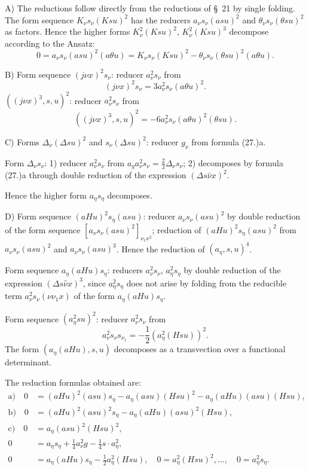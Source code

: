 \documentclass[11pt]{article}
\newcommand{\A}{\Delta}
\begin{document}
A) The reductions follow directly from the reductions of \S\ 21 by single folding. The form sequence $K_\nu s_\nu(Ksu)^2$ has the reducers $a_\nu s_\nu(asu)^2$ and $\theta_\nu s_\nu(\theta su)^2$ as factors. Hence the higher forms $K_\nu^2(Ksu)^2$, $K_\nu^2(Ksu)^3$ decompose according to the Ansatz:
\[
0=a_\nu s_\nu(asu)^2(a\theta u)=K_\nu s_\nu(Ksu)^2-\theta_\nu s_\nu(\theta su)^2(a\theta u).
\]

B) Form sequence $(j\nu x)^2s_\nu$: reducer $a_\nu^2s_\nu$ from
\[
(j\nu x)^2s_\nu=3a_\nu^2s_\nu(a\theta u)^2.
\]
$((j\nu x)^3,s,u)^2$: reducer $a_\nu^2s_\nu$ from
\[
((j\nu x)^3,s,u)^2=-6a_\nu^2s_\nu(a\theta u)^2(\theta su).
\]

C) Forms $\A_\nu(\A su)^2$ and $s_\nu(\A su)^2$: reducer $g_\nu$ from formula (27.)a.

Form $\A_\nu s_\nu$:
1) reducer $a_\nu^2s_\nu$ from $a_g a_\nu^2s_\nu=\frac23\A_\nu s_\nu$;
2) decomposes by formula (27.)a through double reduction of the expression $(\A s\widehat\nu x)^2$.

Hence the higher form $a_\eta s_\eta$ decomposes.

D) Form sequence $(aHu)^2s_\eta(asu)$: reducer $a_\nu s_\nu(asu)^2$ by double reduction of the form sequence $[a_\nu s_\nu(asu)^2]_{\nu_1x^2}$; reduction of $(aHu)^2s_\eta(asu)^2$ from $a_\nu s_\nu(asu)^2$ and $a_\nu s_\nu(asu)^3$. Hence the reduction of $(a_\eta,s,u)^4$.

Form sequence $a_\eta(aHu)s_\eta$: reducers $a_\nu^2s_\nu$, $a_\eta^2s_\eta$ by double reduction of the expression $(\A s\widehat\nu x)^3$, since $a_\eta^2s_\eta$ does not arise by folding from the reducible term $a_\nu^2s_\nu(\nu\nu_1x)$ of the form $a_\eta(aHu)s_\eta$.

Form sequence $(a_\eta^2su)^2$: reducer $a_\nu^2s_\nu$ from
\[
a_\nu^2s_\nu s_{\nu_1}=-\frac12(a_\eta^2(Hsu))^2.
\]
The form $(a_\eta(aHu),s,u)$ decomposes as a transvection over a functional determinant.

The reduction formulas obtained are:
\[
\tag{30}
\begin{aligned}
\text{a)}\quad 0&=(aHu)^2(asu)s_\eta-a_\eta(asu)(Hsu)^2-a_\eta(aHu)(asu)(Hsu),\\
\text{b)}\quad 0&=(aHu)^2(asu)^2s_\eta-a_\eta(aHu)(asu)^2(Hsu),\\
\text{c)}\quad 0&=a_\eta(asu)^2(Hsu)^2,\\
0&=a_\eta s_\eta+\frac14a_\nu^2g-\frac14s\cdot a_\eta^2,\\
0&=a_\eta(aHu)s_\eta-\frac12a_\eta^2(Hsu),
\quad 0=a_\eta^2(Hsu)^2,\ldots,
\quad 0=a_\eta^2s_\eta.
\end{aligned}
\]
\end{document}
